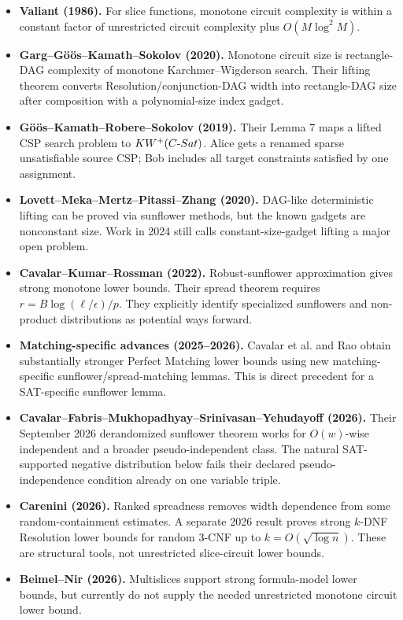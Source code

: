 \documentclass[11pt]{article}
\begin{document}
\begin{itemize}
\item[] \textbf{Valiant (1986).} For slice functions, monotone circuit complexity is within a constant factor of unrestricted circuit complexity plus \(O(M\log^2 M)\).

\item[] \textbf{Garg--G\"o\"os--Kamath--Sokolov (2020).} Monotone circuit size is rectangle-DAG complexity of monotone Karchmer--Wigderson search. Their lifting theorem converts Resolution/conjunction-DAG width into rectangle-DAG size after composition with a polynomial-size index gadget.

\item[] \textbf{G\"o\"os--Kamath--Robere--Sokolov (2019).} Their Lemma 7 maps a lifted CSP search problem to \(KW^+(C\hbox{-}Sat)\). Alice gets a renamed sparse unsatisfiable source CSP; Bob includes all target constraints satisfied by one assignment.

\item[] \textbf{Lovett--Meka--Mertz--Pitassi--Zhang (2020).} DAG-like deterministic lifting can be proved via sunflower methods, but the known gadgets are nonconstant size. Work in 2024 still calls constant-size-gadget lifting a major open problem.

\item[] \textbf{Cavalar--Kumar--Rossman (2022).} Robust-sunflower approximation gives strong monotone lower bounds. Their spread theorem requires \(r=B\log(\ell/\epsilon)/p\). They explicitly identify specialized sunflowers and non-product distributions as potential ways forward.

\item[] \textbf{Matching-specific advances (2025--2026).} Cavalar et al. and Rao obtain substantially stronger Perfect Matching lower bounds using new matching-specific sunflower/spread-matching lemmas. This is direct precedent for a SAT-specific sunflower lemma.

\item[] \textbf{Cavalar--Fabris--Mukhopadhyay--Srinivasan--Yehudayoff (2026).} Their September 2026 derandomized sunflower theorem works for \(O(w)\)-wise independent and a broader pseudo-independent class. The natural SAT-supported negative distribution below fails their declared pseudo-independence condition already on one variable triple.

\item[] \textbf{Carenini (2026).} Ranked spreadness removes width dependence from some random-containment estimates. A separate 2026 result proves strong \(k\)-DNF Resolution lower bounds for random 3-CNF up to \(k=O(\sqrt{\log n})\). These are structural tools, not unrestricted slice-circuit lower bounds.

\item[] \textbf{Beimel--Nir (2026).} Multislices support strong formula-model lower bounds, but currently do not supply the needed unrestricted monotone circuit lower bound.
\end{itemize}
\end{document}
